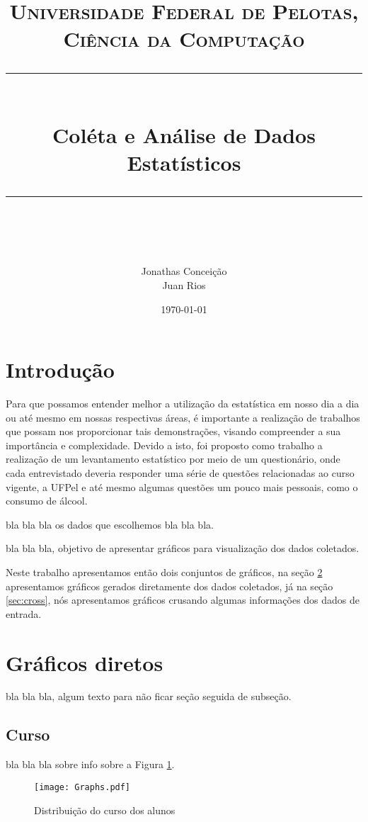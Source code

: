 \documentclass[11pt]{scrartcl} %
\title{
  \normalfont\normalsize
  \textsc{Universidade Federal de Pelotas, Ciência da Computação}\\ %
  \vspace{25pt} %
  \rule{\linewidth}{0.5pt}\\ %
  \vspace{20pt} %
  {\huge Coléta e Análise de Dados Estatísticos}\\ %
  \vspace{12pt} %
  \rule{\linewidth}{2pt}\\ %
  \vspace{12pt} %
}
\author{
  \LARGE Jonathas Conceição\\
  \LARGE Juan Rios
}
\date{\normalsize\today} %
\begin{document}
\maketitle %


\section{Introdução}

Para que possamos entender melhor a utilização da estatística em nosso dia a dia ou até mesmo em nossas respectivas áreas, é importante a realização de trabalhos que possam nos proporcionar tais demonstrações, visando compreender a sua importância e complexidade. Devido a isto, foi proposto como trabalho a realização de um levantamento estatístico por meio de um questionário, onde cada entrevistado deveria responder uma série de questões relacionadas ao curso vigente, a UFPel e até mesmo algumas questões um pouco mais pessoais, como o consumo de álcool.



bla bla bla os dados que escolhemos bla bla bla.

bla bla bla, objetivo de apresentar gráficos para visualização dos dados coletados.


Neste trabalho apresentamos então dois conjuntos de gráficos,
na seção \ref{sec:raw} apresentamos gráficos gerados diretamente dos dados coletados,
já na seção \ref{sec:cross}, nós apresentamos gráficos crusando algumas informações dos dados de entrada.


\section{Gráficos diretos}\label{sec:raw}

bla bla bla, algum texto para não ficar seção seguida de subseção.

\subsection{Curso}

bla bla bla sobre info sobre a Figura \ref{fig:graph1}.

\begin{figure}[h]
  \centering
  \texttt{[image: Graphs.pdf]}
  \label{fig:graph1}
  \caption{Distribuição do curso dos alunos}
\end{figure}
\end{document}
